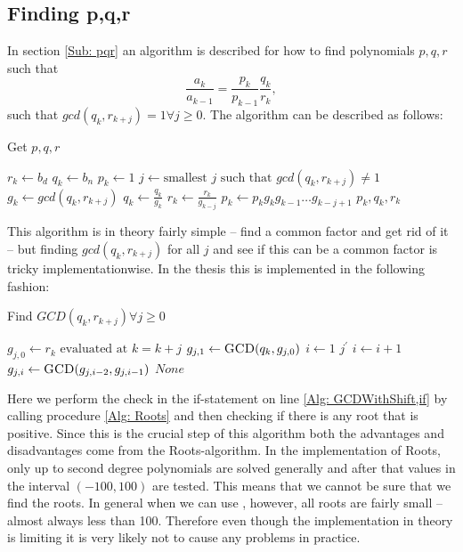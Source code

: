 \subsection{Finding p,q,r}
In section \ref{Sub: pqr} an algorithm is described for how to find polynomials $p,q,r$ such that
\begin{equation}\label{Eq: getpqr}
  \frac{a_k}{a_{k-1}} = \frac{p_k}{p_{k-1}}\frac{q_k}{r_k},
\end{equation}
such that $gcd(q_k,r_{k+j})=1 \forall j\geq 0$. The algorithm can be described as follows:
\begin{algorithm}[H]
  \caption{Get $p,q,r$}
  \begin{algorithmic}[1]
      \State $r_k\gets b_d$
      \State $q_k\gets b_n$
      \State $p_k\gets 1$
        \State $j\gets \text{smallest } j \text{ such that } gcd(q_k,r_{k+j})\neq 1$
        \State $g_k\gets gcd(q_k,r_{k+j})$
        \State $q_k\gets \frac{q_k}{g_k}$
        \State $r_k\gets \frac{r_k}{g_{k-j}}$
        \State $p_k\gets p_kg_kg_{k-1}\ldots g_{k-j+1}$
      \EndWhile
      \State \Return $p_k,q_k,r_k$
    \EndProcedure
  \end{algorithmic}
\end{algorithm}
This algorithm is in theory fairly simple -- find a common factor and get rid of it -- but finding $gcd(q_k,r_{k+j})$ for all $j$ and see if this can be a common factor is tricky implementationwise. In the thesis this is implemented in the following fashion:
\begin{algorithm}[H]
  \caption{Find $GCD(q_k,r_{k+j})\forall j\geq 0$}
  \begin{algorithmic}[1]
      \State $g_{j,0}\gets r_k \text{ evaluated at } k=k+j$
      \State $g_{j,1}\gets \Call{GCD}{q_k,g_{j,0}}$
      \State $i\gets 1$
        \label{Alg: GCDWithShift,if}
          \State \Return $j^\prime$
        \EndIf
        \State $i\gets i+1$
        \State $g_{j,i}\gets \Call{GCD}{g_{j,i-2},g_{j,i-1}}$
      \EndWhile
      \State \Return $None$
    \EndProcedure
  \end{algorithmic}
\end{algorithm}
Here we perform the check in the if-statement on line \ref{Alg: GCDWithShift,if} by calling procedure \ref{Alg: Roots} and then checking if there is any root that is positive. Since this is the crucial step of this algorithm both the advantages and disadvantages come from the Roots-algorithm. In the implementation of Roots, only up to second degree polynomials are solved generally and after that values in the interval $(-100,100)$ are tested. This means that we cannot be sure that we find the roots. In general when we can use \WZ, however, all roots are fairly small -- almost always less than 100. Therefore even though the implementation in theory is limiting it is very likely not to cause any problems in practice.
